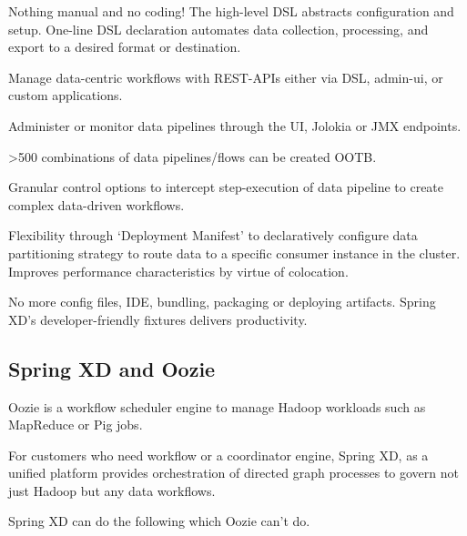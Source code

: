 \begin{itemize*}
\item Nothing manual and no coding! The high-level DSL abstracts configuration and setup. One-line DSL declaration automates data collection, processing, and export to a desired format or destination.
\item Manage data-centric workflows with REST-APIs either via DSL, admin-ui, or custom applications.
\item Administer or monitor data pipelines through the UI, Jolokia or JMX endpoints. 
\item >500 combinations of data pipelines/flows can be created OOTB.
\item Granular control options to intercept step-execution of data pipeline to create complex data-driven workflows.
\item Flexibility through `Deployment Manifest' to declaratively configure data partitioning strategy to route data to a specific consumer instance in the cluster. Improves performance characteristics by virtue of colocation.
\end{itemize*}

No more config files, IDE, bundling, packaging or deploying artifacts. Spring XD's developer-friendly fixtures delivers productivity. 

\subsection{Spring XD and Oozie}
Oozie is a workflow scheduler engine to manage Hadoop workloads such as MapReduce or Pig jobs. 

For customers who need workflow or a coordinator engine, Spring XD, as a unified platform provides orchestration of directed graph processes to govern not just Hadoop but any data workflows. 

Spring XD can do the following which Oozie can't do.

